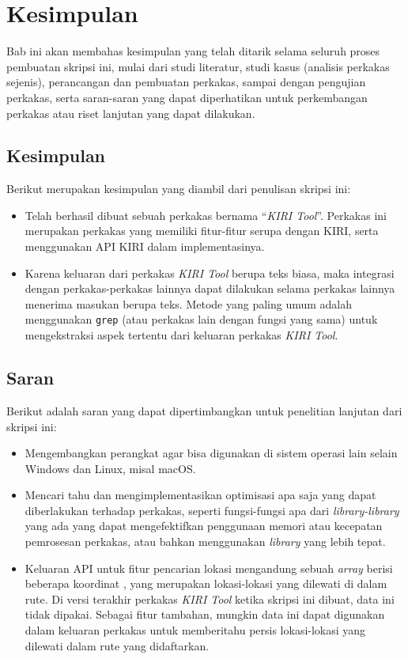 \chapter{Kesimpulan}
\label{chap:conclusion}

Bab ini akan membahas kesimpulan yang telah ditarik selama seluruh proses pembuatan skripsi ini, mulai dari studi literatur, studi kasus (analisis perkakas sejenis), perancangan dan pembuatan perkakas, sampai dengan pengujian perkakas, serta saran-saran yang dapat diperhatikan untuk perkembangan perkakas atau riset lanjutan yang dapat dilakukan.

\section{Kesimpulan}
\label{chap:conclusion-endnotes}

Berikut merupakan kesimpulan yang diambil dari penulisan skripsi ini:

\begin{itemize}
	\item Telah berhasil dibuat sebuah perkakas bernama ``\textit{KIRI Tool}''. Perkakas ini merupakan perkakas \cl\xspace yang memiliki fitur-fitur serupa dengan KIRI, serta menggunakan API KIRI dalam implementasinya.
	\item Karena keluaran dari perkakas \textit{KIRI Tool} berupa teks biasa, maka integrasi dengan perkakas-perkakas \cl\xspace lainnya dapat dilakukan selama perkakas \cl\xspace lainnya menerima masukan berupa teks. Metode yang paling umum adalah menggunakan \verb|grep| (atau perkakas lain dengan fungsi yang sama) untuk mengekstraksi aspek tertentu dari keluaran perkakas \textit{KIRI Tool}.
\end{itemize}

\section{Saran}
\label{chap:conclusion-feedbacks}

Berikut adalah saran yang dapat dipertimbangkan untuk penelitian lanjutan dari skripsi ini:

\begin{itemize}
	\item Mengembangkan perangkat agar bisa digunakan di sistem operasi lain selain Windows dan Linux, misal macOS.
	\item Mencari tahu dan mengimplementasikan optimisasi apa saja yang dapat diberlakukan terhadap perkakas, seperti fungsi-fungsi apa dari \textit{library-library} yang ada yang dapat mengefektifkan penggunaan memori atau kecepatan pemrosesan perkakas, atau bahkan menggunakan \textit{library} yang lebih tepat.
	\item Keluaran API untuk fitur pencarian lokasi mengandung sebuah \textit{array} berisi beberapa koordinat \latlon, yang merupakan lokasi-lokasi yang dilewati di dalam rute. Di versi terakhir perkakas \textit{KIRI Tool} ketika skripsi ini dibuat, data ini tidak dipakai. Sebagai fitur tambahan, mungkin data ini dapat digunakan dalam keluaran perkakas untuk memberitahu persis lokasi-lokasi yang dilewati dalam rute yang didaftarkan.
\end{itemize}